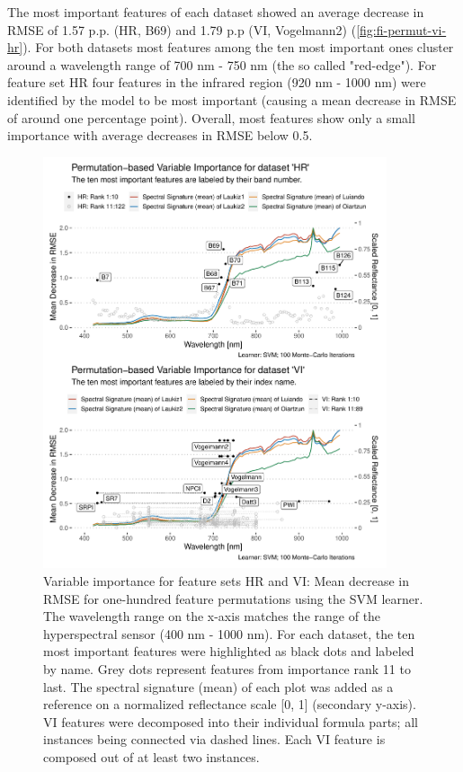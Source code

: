 \documentclass[letterpaper, peerreview, draftcls]{IEEEtran}
\begin{document}

The most important features of each dataset showed an average decrease in RMSE of 1.57 p.p. (HR, B69) and 1.79 p.p (VI, Vogelmann2) (\autoref{fig:fi-permut-vi-hr}).
For both datasets most features among the ten most important ones cluster around a wavelength range of 700 nm - 750 nm (the so called "red-edge").
For feature set HR four features in the infrared region (920 nm - 1000 nm) were identified by the model to be most important (causing a mean decrease in RMSE of around one percentage point).
Overall, most features show only a small importance with average decreases in RMSE below 0.5.

\begin{figure} [ht!]
	\centering
	\begin{center}
		\includegraphics[width=0.9\textwidth] {fi-permut-vi-hr-1.pdf}
		\caption{Variable importance for feature sets HR and VI: Mean decrease in RMSE for one-hundred feature permutations using the SVM learner. The wavelength range on the x-axis matches the range of the hyperspectral sensor (400 nm - 1000 nm). For each dataset, the ten most important features were highlighted as black dots and labeled by name. Grey dots represent features from importance rank 11 to last. The spectral signature (mean) of each plot was added as a reference on a normalized reflectance scale [0, 1] (secondary y-axis). VI features were decomposed into their individual formula parts; all instances being connected via dashed lines. Each VI feature is composed out of at least two instances.}\label{fig:fi-permut-vi-hr}
	\end{center}
\end{figure}
\end{document}
